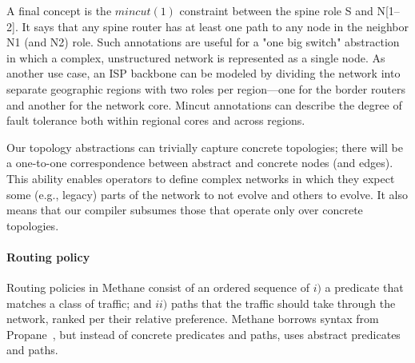 \documentclass[numbers, 10pt, preprint]{sigplanconf}
\newcommand{\sysname}{{\small \sf Methane}\xspace}
\newcommand{\para}[1]{\paragraph*{\textbf{#1}}}
\newcommand{\Mincut}{\mathit{mincut}}
\begin{document}
A final concept is the $\Mincut(1)$ constraint between the spine role S and N[1--2]. It says that any spine router has at least one path to any node in the neighbor N1 (and N2) role. Such annotations are useful for a "one big switch" abstraction \cite{Casado:2010} in which a complex, unstructured network is represented as a single node. As another use case, an ISP backbone can be modeled by dividing the network into separate geographic regions with two roles per region---one for the border routers and another for the network core. Mincut annotations can describe the degree of fault tolerance both within regional cores and across regions.

Our topology abstractions can trivially capture concrete topologies; there will be a one-to-one correspondence between abstract and concrete nodes (and edges). This ability enables operators to define complex networks in which they expect some (e.g., legacy) parts of the network to not evolve and others to evolve. It also means that our compiler subsumes those that operate only over concrete topologies.


%


\para{Routing policy} Routing policies in \sysname consist of an ordered sequence of $i)$ a predicate that matches a class of traffic; and $ii)$ paths that the traffic should take through the network, ranked per their relative preference. \sysname borrows syntax from Propane~\cite{propane}, but instead of concrete predicates and paths, uses abstract predicates and paths.
\end{document}
